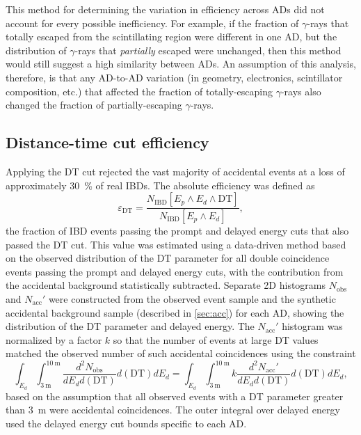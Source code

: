 This method for determining the variation in efficiency across ADs
did not account for every possible inefficiency.
For example, if the fraction of $\gamma$-rays that totally
escaped from the scintillating region were different in one AD,
but the distribution of $\gamma$-rays that \textit{partially} escaped were unchanged,
then this method would still suggest a high similarity between ADs.
An assumption of this analysis, therefore, is that any AD-to-AD variation
(in geometry, electronics, scintillator composition, etc.)
that affected the fraction of totally-escaping $\gamma$-rays
also changed the fraction of partially-escaping $\gamma$-rays.

\subsection{Distance-time cut efficiency}
\label{subsec:eff_DT}

Applying the DT cut rejected the vast majority of accidental events
at a loss of approximately \SI{30}{\percent} of real IBDs.
The absolute efficiency was defined as
\begin{equation}\label{eq:abs_DT_eff}
    \varepsilon_{\text{DT}} = \frac{
        N_\text{IBD}[E_p \wedge E_d \wedge \text{DT}]
    }%
    {
        N_\text{IBD}[E_p \wedge E_d]
    },
\end{equation}
the fraction of IBD events passing the prompt and delayed energy cuts
that also passed the DT cut.
This value was estimated using a data-driven method
based on the observed distribution of the DT parameter
for all double coincidence events passing the prompt and delayed energy cuts,
with the contribution from the accidental background
statistically subtracted.
Separate 2D histograms $N_\text{obs}$ and $N_\text{acc}'$
were constructed from the observed event sample
and the synthetic accidental background sample (described in \cref{sec:acc}) for each AD,
showing the distribution of the DT parameter and delayed energy.
The $N_\text{acc}'$ histogram was normalized by a factor $k$ so that
the number of events at large DT values
matched the observed number of such accidental coincidences
using the constraint
\begin{equation}\label{eq:acc_sub_normalized}
    \int_{E_d}\int_{\SI{3}{\m}}^{\SI{10}{\m}}
    \frac{d^2N_\text{obs}}{dE_d d(\text{DT})}
    d(\text{DT}) dE_d
    =
    \int_{E_d}\int_{\SI{3}{\m}}^{\SI{10}{\m}}
    k\frac{d^2N_\text{acc}'}{dE_d d(\text{DT})}
    d(\text{DT}) dE_d,
\end{equation}
based on the assumption that all observed events
with a DT parameter greater than \SI{3}{\m}
were accidental coincidences.
The outer integral over delayed energy
used the delayed energy cut bounds specific to each AD.

